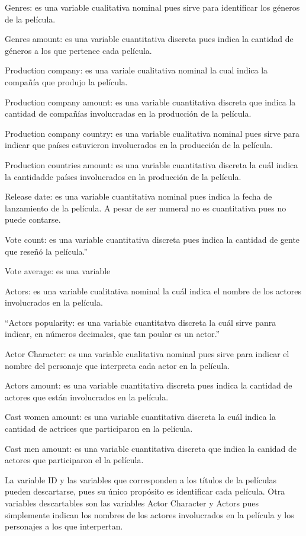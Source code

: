\documentclass[
]{article}
\begin{document}
Genres: es una variable cualitativa nominal pues sirve para identificar
los géneros de la película.

Genres amount: es una variable cuantitativa discreta pues indica la
cantidad de géneros a los que pertence cada película.

Production company: es una variale cualitativa nominal la cual indica la
compañía que produjo la película.

Production company amount: es una variable cuantitativa discreta que
indica la cantidad de compañías involucradas en la producción de la
película.

Production company country: es una variable cualitativa nominal pues
sirve para indicar que países estuvieron involucrados en la producción
de la película.

Production countries amount: es una variable cuantitativa discreta la
cuál indica la cantidadde países involucrados en la producción de la
película.

Release date: es una variable cuantitativa nominal pues indica la fecha
de lanzamiento de la película. A pesar de ser numeral no es cuantitativa
pues no puede contarse.

Vote count: es una variable cuantitativa discreta pues indica la
cantidad de gente que reseñó la película.''

Vote average: es una variable

Actors: es una variable cualitativa nominal la cuál indica el nombre de
los actores involucrados en la película.

``Actors popularity: es una variable cuantitatva discreta la cuál sirve
panra indicar, en números decimales, que tan poular es un actor.''

Actor Character: es una variable cualitativa nominal pues sirve para
indicar el nombre del personaje que interpreta cada actor en la
película.

Actors amount: es una variable cuantitativa discreta pues indica la
cantidad de actores que están involucrados en la película.

Cast women amount: es una variable cuantitativa discreta la cuál indica
la cantidad de actrices que participaron en la película.

Cast men amount: es una variable cuantitativa discreta que indica la
canidad de actores que participaron el la película.

La variable ID y las variables que corresponden a los títulos de la
películas pueden descartarse, pues su único propósito es identificar
cada película. Otra variables descartables son las variables Actor
Character y Actors pues simplemente indican los nombres de los actores
involucrados en la película y los personajes a los que interpertan.
\end{document}
